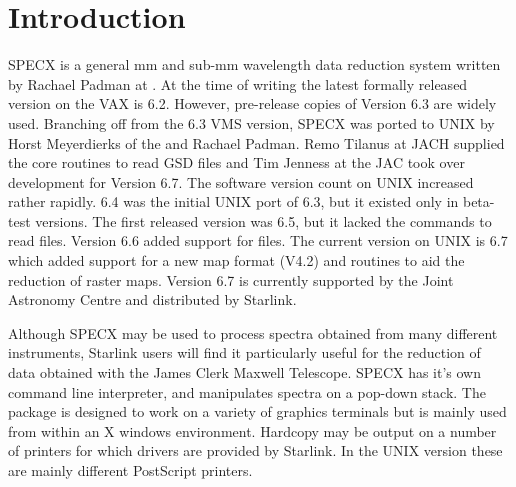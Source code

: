 \documentclass[twoside,11pt,nolof]{starlink}
\begin{document}
\scfrontmatter

\section {Introduction}

SPECX is a general mm and sub-mm wavelength data reduction system written by
Rachael Padman at . At the
time of writing the latest formally released version on the VAX is 6.2.
However, pre-release copies of Version 6.3 are widely used. Branching off from
the 6.3 VMS version, SPECX was ported to UNIX by Horst Meyerdierks of the
 and Rachael
Padman. Remo Tilanus at JACH supplied the core routines to read GSD files and
Tim Jenness at the JAC took over development for Version 6.7. The software
version count on UNIX increased rather rapidly. 6.4 was the initial UNIX port
of 6.3, but it existed only in beta-test versions. The first released version
was 6.5, but it lacked the commands to read  files.
Version 6.6 added support for  files. The current version
on UNIX is 6.7 which added support for a new  map format
(V4.2) and routines to aid the reduction of raster maps. Version 6.7 is
currently supported by the Joint Astronomy Centre and distributed by Starlink.

Although SPECX may be used to process spectra obtained from many different
instruments, Starlink users will find it particularly useful for the reduction
of data obtained with the James Clerk Maxwell Telescope.  SPECX has it's own
command line interpreter, and manipulates spectra on a pop-down stack.  The
package is designed to work on a variety of graphics terminals but is mainly
used from within an X windows environment. Hardcopy may be output on a number
of printers for which  drivers are provided by Starlink. In
the UNIX version these are mainly different PostScript printers.
\end{document}
